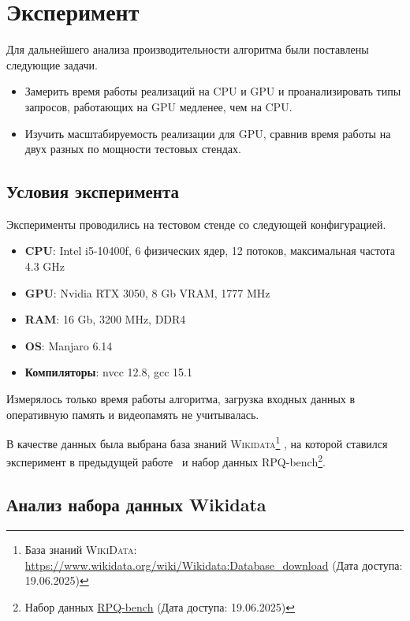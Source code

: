
\section{Эксперимент}

Для дальнейшего анализа производительности алгоритма были поставлены следующие задачи.
\begin{itemize}
    \item Замерить время работы реализаций на CPU и GPU и проанализировать типы запросов, работающих на GPU медленее, чем на CPU.
    \item Изучить масштабируемость реализации для GPU, сравнив время работы на двух разных по мощности тестовых стендах.  
\end{itemize}

\subsection{Условия эксперимента}
Эксперименты проводились на тестовом стенде со следующей конфигурацией.
\begin{itemize}
    \item \textbf{CPU}: Intel i5-10400f, 6 физических ядер, 12 потоков, максимальная частота 4.3 GHz
    \item \textbf{GPU}: Nvidia RTX 3050, 8 Gb VRAM, 1777 MHz
    \item \textbf{RAM}: 16 Gb, 3200 MHz, DDR4
    \item \textbf{OS}: Manjaro 6.14
    \item \textbf{Компиляторы}: nvcc 12.8, gcc 15.1
\end{itemize}
Измерялось только время работы алгоритма, загрузка входных данных в оперативную память и видеопамять не учитывалась.

В качестве данных была выбрана база знаний \textsc{Wikidata}\footnote{База знаний \textsc{WikiData}: \href{https://www.wikidata.org/wiki/Wikidata:Database_download}{https://www.wikidata.org/wiki/Wikidata:Database\_download} (Дата доступа: 19.06.2025)} \cite{wikidata}, на которой ставился эксперимент в предыдущей работе~\cite{PrevWork} и набор данных RPQ-bench\footnote{Набор данных \href{https://github.com/Mamenglu/LD-RPQB}{RPQ-bench} (Дата доступа: 19.06.2025)}.

\subsection{Анализ набора данных Wikidata}

